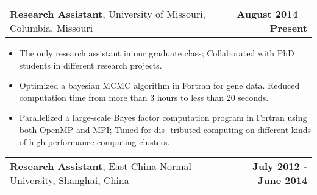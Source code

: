 \documentclass[11pt]{article}
\makeatletter
\newcommand{\headerrow}[2]
{\begin{tabular*}{\linewidth}{l@{\extracolsep{\fill}}r}
	#1 & #2 \\
\end{tabular*}
}
\makeatother
\begin{document}
\headerrow
{\textbf{Research Assistant}, University of Missouri, Columbia, Missouri}
{\textbf{August 2014 – Present}}
\begin{itemize}
	\item The only research assistant in our graduate class; Collaborated with PhD students in different research projects.
	\item Optimized a bayesian MCMC algorithm in Fortran for gene data. Reduced computation time from more than 3 hours to less than 20 seconds.
	\item Parallelized a large-scale Bayes factor computation program in Fortran using both OpenMP and MPI; Tuned for dis- tributed computing on different kinds of high performance computing clusters.
\end{itemize}

\noindent\headerrow
{\textbf{Research Assistant}, East China Normal University, Shanghai, China}
{\textbf{July 2012 - June 2014}}
\end{document}
